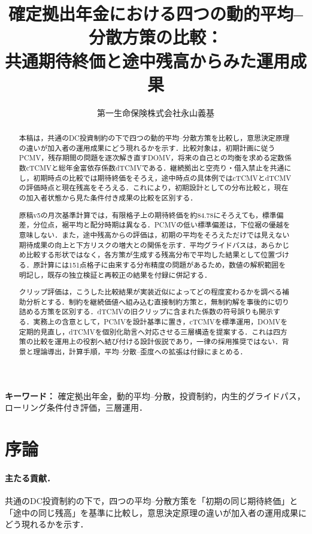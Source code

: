 \documentclass[10pt,a4paper]{article}
\title{確定拠出年金における四つの動的平均--分散方策の比較：\\
\large 共通期待終価と途中残高からみた運用成果}
\author{第一生命保険株式会社\quad 永山義基}\date{}
\theoremstyle{plain}
\theoremstyle{definition}
\begin{document}
\maketitle
\begin{abstract}
本稿は，共通のDC投資制約の下で四つの動的平均--分散方策を比較し，意思決定原理の違いが加入者の運用成果にどう現れるかを示す．比較対象は，初期計画に従うPCMV，残存期間の問題を逐次解き直すDOMV，将来の自己との均衡を求める定数係数cTCMVと総年金富依存係数dTCMVである．継続拠出と空売り・借入禁止を共通にし，初期時点の比較では期待終価をそろえ，途中時点の具体例ではcTCMVとdTCMVの評価時点と現在残高をそろえる．これにより，初期設計としての分布比較と，現在の加入者状態から見た条件付き成果の比較を区別する．

原稿v5の月次基準計算では，有限格子上の期待終価を約84.78にそろえても，標準偏差，分位点，裾平均と配分時期は異なる．PCMVの低い標準偏差は，下位裾の優越を意味しない．また，途中残高からの評価は，初期の平均をそろえただけでは見えない期待成果の向上と下方リスクの増大との関係を示す．平均グライドパスは，あらかじめ比較する形状ではなく，各方策が生成する残高分布で平均した結果として位置づける．原計算には151点格子に由来する分布精度の問題があるため，数値の解釈範囲を明記し，既存の独立検証と再較正の結果を付録に併記する．

クリップ評価は，こうした比較結果が実装近似によってどの程度変わるかを調べる補助分析とする．制約を継続価値へ組み込む直接制約方策と，無制約解を事後的に切り詰める方策を区別する．dTCMVの旧クリップに含まれた係数の符号誤りも開示する．実務上の含意として，PCMVを設計基準に置き，cTCMVを標準運用，DOMVを定期的見直し，dTCMVを個別化助言へ対応させる三層構造を提案する．これは四方策の比較を運用上の役割へ結び付ける設計仮説であり，一律の採用推奨ではない．背景と理論導出，計算手順，平均--分散--歪度への拡張は付録にまとめる．
\end{abstract}
\noindent\textbf{キーワード：} 確定拠出年金，動的平均--分散，投資制約，内生的グライドパス，ローリング条件付き評価，三層運用．
\vspace{3mm}\setcounter{tocdepth}{1}{\footnotesize\tableofcontents}\clearpage
\section{序論}
\label{sec:introduction}
\paragraph{主たる貢献．}
共通のDC投資制約の下で，四つの平均--分散方策を「初期の同じ期待終価」と「途中の同じ残高」を基準に比較し，意思決定原理の違いが加入者の運用成果にどう現れるかを示す．
\end{document}
